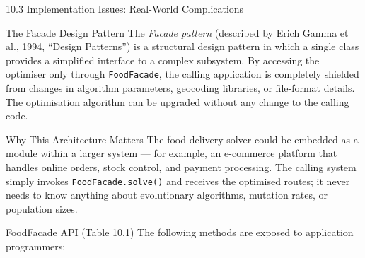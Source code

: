 \documentclass[aspectratio=169,10pt]{beamer}
\begin{document}
\begin{frame}[allowframebreaks]{10.3 Implementation Issues: Real-World Complications}
  \framebreak

  \begin{block}{The Facade Design Pattern}
    The \emph{Facade pattern} (described by Erich Gamma et al.,
    1994, ``Design Patterns'') is a structural design pattern in which
    a single class provides a simplified interface to a complex
    subsystem.  By accessing the optimiser only through
    \texttt{FoodFacade}, the calling application is completely
    shielded from changes in algorithm parameters, geocoding
    libraries, or file-format details.  The optimisation algorithm
    can be upgraded without any change to the calling code.
  \end{block}

  \begin{exampleblock}{Why This Architecture Matters}
    The food-delivery solver could be embedded as a module within a
    larger system — for example, an e-commerce platform that handles
    online orders, stock control, and payment processing.
    The calling system simply invokes \texttt{FoodFacade.solve()} and
    receives the optimised routes; it never needs to know anything
    about evolutionary algorithms, mutation rates, or population sizes.
  \end{exampleblock}

  \framebreak

  \begin{block}{FoodFacade API (Table 10.1)}
    The following methods are exposed to application programmers:
  \end{block}


\end{frame}
\end{document}
